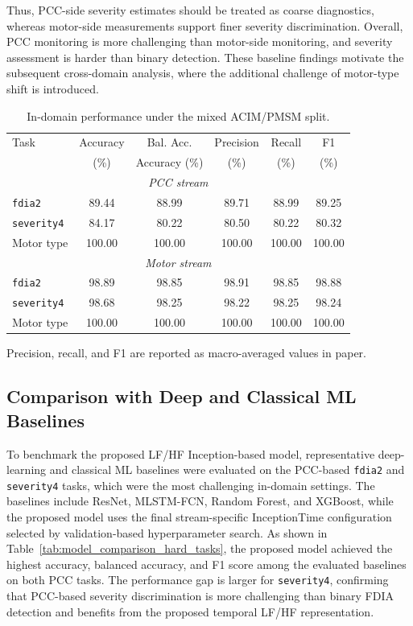 \documentclass[lettersize,journal]{IEEEtran}
\begin{document}
Thus, PCC-side severity estimates should be treated as coarse diagnostics, whereas motor-side measurements support finer severity discrimination. Overall, PCC monitoring is more challenging than motor-side monitoring, and severity assessment is harder than binary detection. These baseline findings motivate the subsequent cross-domain analysis, where the additional challenge of motor-type shift is introduced.

\begin{table}[t]
\centering
\caption{In-domain performance under the mixed ACIM/PMSM split.}
\label{tab:all_tasks_in_domain}
\renewcommand{\arraystretch}{1.15}
\setlength{\tabcolsep}{4pt}
\begin{tabular}{l c c c c c}
\hline
Task & Accuracy & Bal. Acc. & Precision & Recall & F1 \\
     & (\%)    & Accuracy (\%)      & (\%)   & (\%)   & (\%) \\
\hline
\multicolumn{6}{c}{\textit{PCC stream}} \\
\hline
\texttt{fdia2}      & 89.44 & 88.99 & 89.71 & 88.99 & 89.25 \\
\texttt{severity4}  & 84.17 & 80.22 & 80.50 & 80.22 & 80.32 \\
Motor type          & 100.00 & 100.00 & 100.00 & 100.00 & 100.00 \\
\hline
\multicolumn{6}{c}{\textit{Motor stream}} \\
\hline
\texttt{fdia2}      & 98.89 & 98.85 & 98.91 & 98.85 & 98.88 \\
\texttt{severity4}  & 98.68 & 98.25 & 98.22 & 98.25 & 98.24 \\
Motor type          & 100.00 & 100.00 & 100.00 & 100.00 & 100.00 \\
\hline
\end{tabular}
\vspace{1mm}
\begin{flushleft}
\scriptsize Precision, recall, and F1 are reported as macro-averaged values in paper.
\end{flushleft}
\end{table}

\subsection{Comparison with Deep and Classical ML Baselines}
\label{sec:model_comparison}
To benchmark the proposed LF/HF Inception-based model, representative deep-learning and classical ML baselines were evaluated on the PCC-based \texttt{fdia2} and \texttt{severity4} tasks, which were the most challenging in-domain settings. The baselines include ResNet, MLSTM-FCN, Random Forest, and XGBoost, while the proposed model uses the final stream-specific InceptionTime configuration selected by validation-based hyperparameter search. As shown in Table~\ref{tab:model_comparison_hard_tasks}, the proposed model achieved the highest accuracy, balanced accuracy, and F1 score among the evaluated baselines on both PCC tasks. The performance gap is larger for \texttt{severity4}, confirming that PCC-based severity discrimination is more challenging than binary FDIA detection and benefits from the proposed temporal LF/HF representation.
\end{document}
